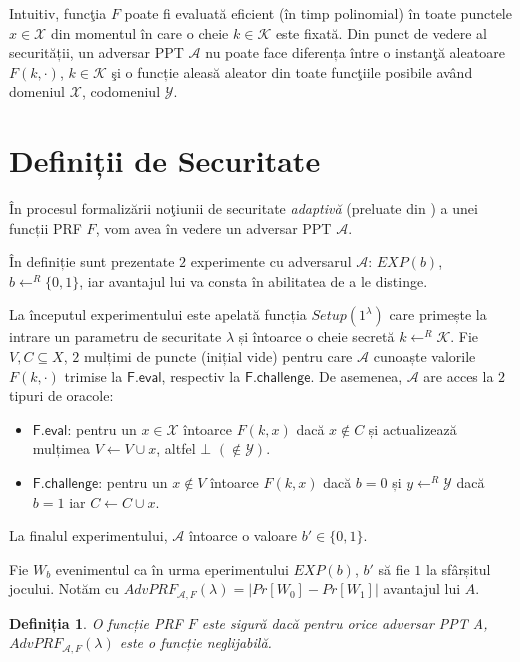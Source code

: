 \documentclass[oneside, 12pt]{book}
\newtheorem{definitie}{\textbf{Definiția}}[section]
\begin{document}
Intuitiv, funcţia $F$ poate fi evaluată eficient (în timp polinomial) în toate punctele $x \in \mathcal{X}$ din momentul în care o cheie $k \in \mathcal{K}$ este fixată. 
Din punct de vedere al securității, un adversar PPT $\mathcal{A}$ nu poate face diferența între o instanţă aleatoare $F(k, \cdot)$, $k \in \mathcal{K}$ şi o funcție aleasă aleator din toate funcţiile posibile având domeniul $\mathcal{X}$, codomeniul $\mathcal{Y}$.


\section{Definiții de Securitate}
\label{subsec:prf-security}

În procesul formalizării noţiunii de securitate \textit{adaptivă} (preluate din \cite{boneh:2013constrained}) a unei funcții PRF $F$, vom avea în vedere un adversar PPT $\mathcal{A}$.

În definiție sunt prezentate $2$ experimente cu adversarul $\mathcal{A}$: $EXP(b)$, $b \leftarrow ^ R \{0,1\}$, iar avantajul lui va consta în abilitatea de a le distinge. 

La începutul experimentului este apelată funcția $Setup(1^\lambda)$ care primește la intrare un parametru de securitate $\lambda$ și întoarce o cheie secretă $k \leftarrow^R \mathcal{K}$. Fie $V, C \subseteq X$, $2$ mulțimi de puncte (inițial vide) pentru care $\mathcal{A}$ cunoaște valorile $F(k, \cdot)$ trimise la $\mathsf{F.eval}$, respectiv la $\mathsf{F.challenge}$. De asemenea, $\mathcal{A}$ are acces la $2$ tipuri de oracole:
\begin{itemize}
	\item $\mathsf{F.eval}$: pentru un $x \in \mathcal{X}$ întoarce $F(k, x)$ dacă $x \not \in C$ și actualizează mulțimea $V \leftarrow V \cup x$, altfel $\bot$ $(\not \in \mathcal{Y})$.
	\item $\mathsf{F.challenge}$: pentru un $x \not \in V$ întoarce $F(k, x)$ dacă $b = 0$ și $y \leftarrow^R \mathcal{Y}$ dacă $b = 1$ iar $C \leftarrow C \cup x$. 
\end{itemize}
La finalul experimentului, $\mathcal{A}$ întoarce o valoare $b' \in \{0, 1\}$.

Fie $W_b$ evenimentul ca în urma eperimentului $EXP(b)$, $b'$ să fie $1$ la sfârșitul jocului. Notăm cu $AdvPRF_{\mathcal{A},F}(\lambda) = |Pr[W_0] - Pr[W_1]|$ avantajul lui $A$.
\\
\begin{definitie}
	O funcție PRF $F$ este sigură dacă pentru orice adversar PPT A, $AdvPRF_{\mathcal{A},F}(\lambda)$ este o funcție neglijabilă.
\end{definitie}
\end{document}
